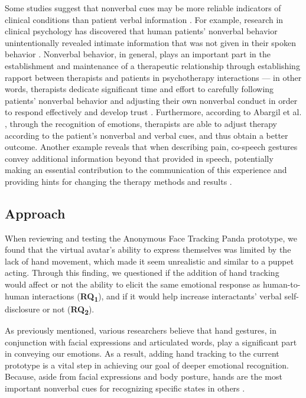 Some studies suggest that nonverbal cues may be more reliable indicators of clinical conditions than patient verbal information \cite{KNA13}. For example, research in clinical psychology has discovered that human patients' nonverbal behavior unintentionally revealed intimate information that was not given in their spoken behavior \cite{FAB06, KLE03}. Nonverbal behavior, in general, plays an important part in the establishment and maintenance of a therapeutic relationship through establishing rapport between therapists and patients in psychotherapy interactions \cite{KLE03} — in other words, therapists dedicate significant time and effort to carefully following patients' nonverbal behavior and adjusting their own nonverbal conduct in order to respond effectively and develop trust \cite{ABA21}. Furthermore, according to Abargil et al. \cite{ABA21}, through the recognition of emotions, therapists are able to adjust therapy according to the patient's nonverbal and verbal cues, and thus obtain a better outcome. Another example reveals that when describing pain, co-speech gestures convey additional information beyond that provided in speech, potentially making an essential contribution to the communication of this experience and providing hints for changing the therapy methods and results \cite{ROW16, REI22}.

\subsection{Approach}

When reviewing and testing the Anonymous Face Tracking Panda prototype, we found that the virtual avatar's ability to express themselves was limited by the lack of hand movement, which made it seem unrealistic and similar to a puppet acting. Through this finding, we questioned if the addition of hand tracking would affect or not the ability to elicit the same emotional response as human-to-human interactions (\textbf{RQ\textsubscript{1}}), and if it would help increase interactants' verbal self-disclosure or not (\textbf{RQ\textsubscript{2}}).

As previously mentioned, various researchers believe that hand gestures, in conjunction with facial expressions and articulated words, play a significant part in conveying our emotions. As a result, adding hand tracking to the current prototype is a vital step in achieving our goal of deeper emotional recognition. Because, aside from facial expressions and body posture, hands are the most important nonverbal cues for recognizing specific states in others \cite{WAX97, REI22}.

